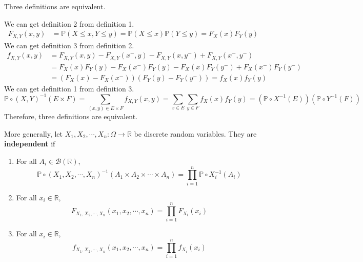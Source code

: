 \documentclass{huhtakm-template-book}
\newcommand{\prob}{\mathbb{P}}
\begin{document}
\newpage
\begin{cla}
	Three definitions are equivalent.
\end{cla}
\begin{proofing}
	We can get definition 2 from definition 1.
	\begin{align*}
		F_{X,Y}(x,y)&=\prob(X\leq x,Y\leq y)=\prob(X\leq x)\prob(Y\leq y)=F_{X}(x)F_{Y}(y)
	\end{align*}
	We can get definition 3 from definition 2.
	\begin{align*}
		f_{X,Y}(x,y)&=F_{X,Y}(x,y)-F_{X,Y}(x^{-},y)-F_{X,Y}(x,y^{-})+F_{X,Y}(x^{-},y^{-})\\
		&=F_{X}(x)F_{Y}(y)-F_{X}(x^{-})F_{Y}(y)-F_{X}(x)F_{Y}(y^{-})+F_{X}(x^{-})F_{Y}(y^{-})\\
		&=(F_{X}(x)-F_{X}(x^{-}))(F_{Y}(y)-F_{Y}(y^{-}))=f_{X}(x)f_{Y}(y)
	\end{align*}
	We can get definition 1 from definition 3.
	\begin{equation*}
		\prob\circ(X,Y)^{-1}(E\times F)=\sum_{(x,y)\in E\times F}f_{X,Y}(x,y)=\sum_{x\in E}\sum_{y\in F}f_{X}(x)f_{Y}(y)=(\prob\circ X^{-1}(E))(\prob\circ Y^{-1}(F))
	\end{equation*}
	Therefore, three definitions are equivalent.
\end{proofing}
\begin{rem}
	More generally, let $X_{1},X_{2},\cdots,X_{n}:\Omega\to\mathbb{R}$ be discrete random variables. They are \textbf{independent} if
	\begin{enumerate}
		\item For all $A_{i}\in\mathcal{B}(\mathbb{R})$,
		\begin{equation*}
			\prob\circ(X_{1},X_{2},\cdots,X_{n})^{-1}(A_{1}\times A_{2}\times\cdots\times A_{n})=\prod_{i=1}^{n}\prob\circ X_{i}^{-1}(A_{i})
		\end{equation*}
		\item For all $x_{i}\in\mathbb{R}$,
		\begin{equation*}
			F_{X_{1},X_{2},\cdots,X_{n}}(x_{1},x_{2},\cdots,x_{n})=\prod_{i=1}^{n}F_{X_{i}}(x_{i})
		\end{equation*}
		\item For all $x_{i}\in\mathbb{R}$,
		\begin{equation*}
			f_{X_{1},X_{2},\cdots,X_{n}}(x_{1},x_{2},\cdots,x_{n})=\prod_{i=1}^{n}f_{X_{i}}(x_{i})
		\end{equation*}
	\end{enumerate}
\end{rem}
\end{document}
